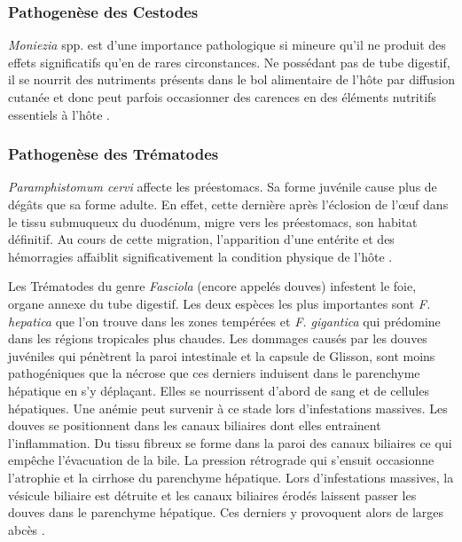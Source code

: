 \subsubsection{Pathogenèse des Cestodes}
\textit{Moniezia} spp. est d'une importance pathologique si mineure qu'il ne produit 
des effets significatifs qu'en de rares circonstances. Ne possédant pas de tube digestif, 
il se nourrit des nutriments présents dans le bol alimentaire de l'hôte par diffusion 
cutanée et donc peut parfois occasionner des carences en des éléments nutritifs essentiels 
à l'hôte . 

\subsubsection{Pathogenèse des Trématodes}

\par \textit{Paramphistomum cervi} affecte les préestomacs. Sa forme juvénile cause 
plus de dégâts que sa forme adulte. En effet, cette dernière après l'éclosion de l'\oe uf 
dans le tissu submuqueux du duodénum, migre vers les préestomacs, son habitat définitif. 
Au cours de cette migration, l'apparition d'une entérite et des hémorragies affaiblit 
significativement la condition physique de l'hôte .
\par Les Trématodes du genre \textit{Fasciola} (encore appelés douves) infestent le 
foie, organe annexe du tube digestif. Les deux espèces les plus importantes sont 
\textit{F. hepatica} que l'on trouve dans les zones tempérées et \textit{F. gigantica} 
qui prédomine dans les régions tropicales plus chaudes. Les dommages causés par les 
douves juvéniles qui pénètrent la paroi intestinale et la capsule de Glisson, sont 
moins pathogéniques que la nécrose que ces derniers induisent dans le parenchyme 
hépatique en s'y déplaçant. Elles se nourrissent d'abord de sang et de cellules hépatiques. 
Une anémie peut survenir à ce stade lors d'infestations massives. Les douves se 
positionnent dans les canaux biliaires dont elles entrainent l'inflammation. Du tissu 
fibreux se forme dans la paroi des canaux biliaires ce qui empêche l'évacuation de la 
bile. La pression rétrograde qui s'ensuit occasionne l'atrophie et la cirrhose du 
parenchyme hépatique. Lors d'infestations massives, la vésicule biliaire est détruite 
et les canaux biliaires érodés laissent passer les douves dans le parenchyme hépatique. 
Ces derniers y provoquent alors de larges abcès .

